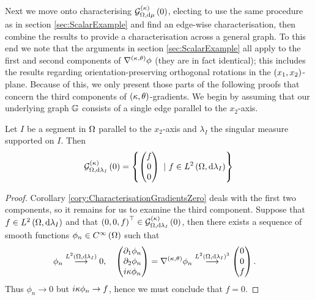 Next we move onto characterising $\mathcal{G}_{ \Omega, \mathrm{d}\mu}^{(\kappa)}\left( 0 \right)$, electing to use the same procedure as in section \ref{sec:ScalarExample} and find an edge-wise characterisation, then combine the results to provide a characterisation across a general graph.
To this end we note that the arguments in section \ref{sec:ScalarExample} all apply to the first and second components of $\nabla^{\left( \kappa, \theta \right)}\phi$ (they are in fact identical); this includes the results regarding orientation-preserving orthogonal rotations in the $\left( x_1,x_2 \right)$-plane.
Because of this, we only present those parts of the following proofs that concern the third components of $\left( \kappa, \theta \right)$-gradients.
We begin by assuming that our underlying graph $\mathbb{G}$ consists of a single edge parallel to the $x_2$-axis.
\begin{prop} \label{prop:kGradZeroParallel}
	Let $I$ be a segment in $\Omega$ parallel to the $x_2$-axis and $\lambda_I$ the singular measure supported on $I$.
	Then
	\begin{align*}
		\kgradZero{\ddom}{\lambda_I} = \clbracs{ 
		\begin{pmatrix} f \\ 0 \\ 0	\end{pmatrix} \ \vert \ f\in\ltwo{\ddom}{\lambda_I}
		}
	\end{align*}
\end{prop}
\begin{proof}
	Corollary \ref{cory:CharacterisationGradientsZero} deals with the first two components, so it remains for us to examine the third component.
	Suppose that $f\in L^{2}\left( \Omega,\mathrm{d}\lambda_I \right)$ and that $\left( 0,0,f \right)^\top\in\mathcal{G}_{ \Omega, \mathrm{d}\lambda_I}^{(\kappa)}\left( 0 \right)$, then there exists a sequence of smooth functions $\phi_n\in C^{\infty}\left( \Omega \right)$ such that
	\begin{align*}
		\phi_n \overset{L^{2}\left( \Omega,\mathrm{d}\lambda_I \right)}{\longrightarrow} 0, &\quad \begin{pmatrix} \partial_1\phi_n \\ \partial_2\phi_n \\ i\kappa\phi_n \end{pmatrix} = \nabla^{\left( \kappa, \theta \right)}\phi_n \overset{L^{2}\left( \Omega,\mathrm{d}\lambda_I \right)^3}{\longrightarrow} \begin{pmatrix} 0 \\ 0 \\ f	\end{pmatrix}.
	\end{align*}
	Thus $\phi_n\rightarrow0$ but $i\kappa\phi_n\rightarrow f$, hence we must conclude that $f=0$.
\end{proof}

